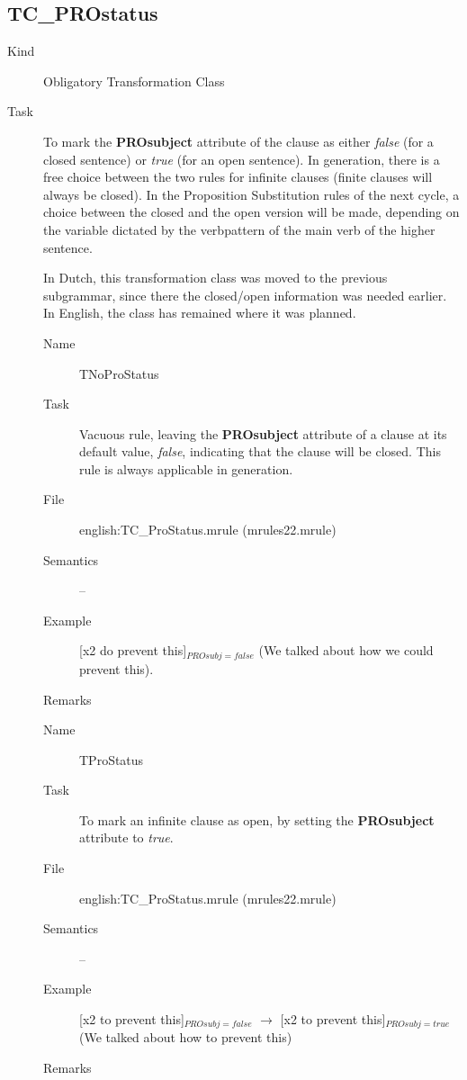 \subsection{TC\_PROstatus}
\begin{description}
\item[Kind] Obligatory Transformation Class
\item[Task] To mark the {\bf PROsubject} attribute of the clause as either {\em 
false\/} (for a closed sentence) or {\em true\/} (for an open sentence). 
In generation, there is a free choice between the two rules 
for infinite clauses (finite clauses will always be closed). In the Proposition 
Substitution rules of the next cycle, a choice between the closed and the open
version will be made, depending on the variable dictated by the verbpattern
of the main verb of the higher sentence. 

In Dutch, this transformation class was moved to the previous subgrammar, since 
there the closed/open information was needed earlier. In English, the class has 
remained where it was planned.

\vspace{1 cm}
\begin{description}
\item[Name] TNoProStatus 
\item[Task] Vacuous rule, leaving the {\bf PROsubject} attribute of a clause at
its default value, {\em false\/}, indicating that the clause will be closed. 
This rule is always applicable in generation.
\item[File] english:TC\_ProStatus.mrule (mrules22.mrule)
\item[Semantics] --
\item[Example] [x2 do prevent this]$_{PROsubj=false}$ 
 (We talked about how we could prevent this).
\item[Remarks]
\end{description}

\vspace{1 cm}
\begin{description}
\item[Name] TProStatus 
\item[Task] To mark an infinite clause as open, by setting the {\bf PROsubject} 
attribute to {\em true\/}.
\item[File] english:TC\_ProStatus.mrule (mrules22.mrule)
\item[Semantics] --
\item[Example] [x2 to prevent this]$_{PROsubj=false}$ $\rightarrow$ 
[x2 to prevent this]$_{PROsubj=true}$ (We talked about how to prevent this)
\item[Remarks]
\end{description}

\end{description}

